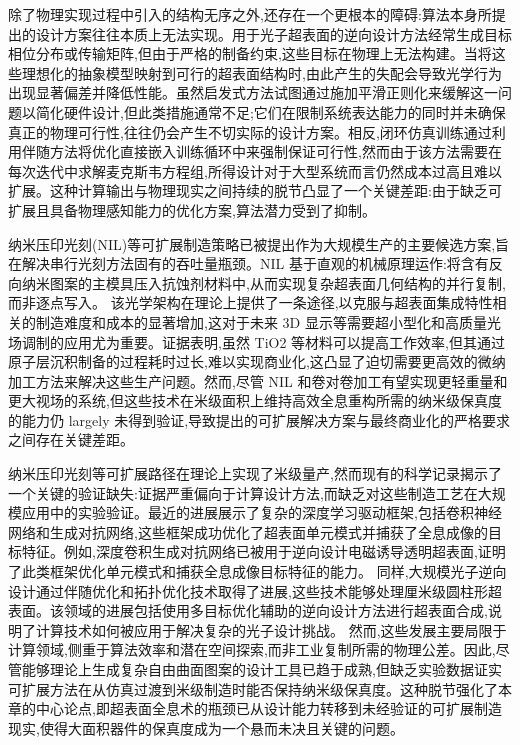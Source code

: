\documentclass[11pt]{article}
\begin{document}
除了物理实现过程中引入的结构无序之外,还存在一个更根本的障碍:算法本身所提出的设计方案往往本质上无法实现。用于光子超表面的逆向设计方法经常生成目标相位分布或传输矩阵,但由于严格的制备约束,这些目标在物理上无法构建。当将这些理想化的抽象模型映射到可行的超表面结构时,由此产生的失配会导致光学行为出现显著偏差并降低性能。虽然启发式方法试图通过施加平滑正则化来缓解这一问题以简化硬件设计,但此类措施通常不足;它们在限制系统表达能力的同时并未确保真正的物理可行性,往往仍会产生不切实际的设计方案。相反,闭环仿真训练通过利用伴随方法将优化直接嵌入训练循环中来强制保证可行性,然而由于该方法需要在每次迭代中求解麦克斯韦方程组,所得设计对于大型系统而言仍然成本过高且难以扩展。这种计算输出与物理现实之间持续的脱节凸显了一个关键差距:由于缺乏可扩展且具备物理感知能力的优化方案,算法潜力受到了抑制。\citep{doi_10_48550_arxiv_2505_18377_a6fc9ec3}

纳米压印光刻(NIL)等可扩展制造策略已被提出作为大规模生产的主要候选方案,旨在解决串行光刻方法固有的吞吐量瓶颈。NIL 基于直观的机械原理运作:将含有反向纳米图案的主模具压入抗蚀剂材料中,从而实现复杂超表面几何结构的并行复制,而非逐点写入。\citep{doi_10_3390_encyclopedia5040197_fe6bfdc9} \citep{doi_10_5772_intechopen_72534_9965e900} 该光学架构在理论上提供了一条途径,以克服与超表面集成特性相关的制造难度和成本的显著增加,这对于未来 3D 显示等需要超小型化和高质量光场调制的应用尤为重要。证据表明,虽然 TiO2 等材料可以提高工作效率,但其通过原子层沉积制备的过程耗时过长,难以实现商业化,这凸显了迫切需要更高效的微纳加工方法来解决这些生产问题。然而,尽管 NIL 和卷对卷加工有望实现更轻重量和更大视场的系统,但这些技术在米级面积上维持高效全息重构所需的纳米级保真度的能力仍 largely 未得到验证,导致提出的可扩展解决方案与最终商业化的严格要求之间存在关键差距。\citep{doi_10_1515_nanoph_2025_0269_b999ce93}

纳米压印光刻等可扩展路径在理论上实现了米级量产,然而现有的科学记录揭示了一个关键的验证缺失:证据严重偏向于计算设计方法,而缺乏对这些制造工艺在大规模应用中的实验验证。最近的进展展示了复杂的深度学习驱动框架,包括卷积神经网络和生成对抗网络,这些框架成功优化了超表面单元模式并捕获了全息成像的目标特征。例如,深度卷积生成对抗网络已被用于逆向设计电磁诱导透明超表面,证明了此类框架优化单元模式和捕获全息成像目标特征的能力。\citep{doi_10_1088_1402_4896_acf007_ad71688e} 同样,大规模光子逆向设计通过伴随优化和拓扑优化技术取得了进展,这些技术能够处理厘米级圆柱形超表面。该领域的进展包括使用多目标优化辅助的逆向设计方法进行超表面合成,说明了计算技术如何被应用于解决复杂的光子设计挑战。\citep{doi_10_1117_12_2529823_81c5e659} 然而,这些发展主要局限于计算领域,侧重于算法效率和潜在空间探索,而非工业复制所需的物理公差。因此,尽管能够理论上生成复杂自由曲面图案的设计工具已趋于成熟,但缺乏实验数据证实可扩展方法在从仿真过渡到米级制造时能否保持纳米级保真度。这种脱节强化了本章的中心论点,即超表面全息术的瓶颈已从设计能力转移到未经验证的可扩展制造现实,使得大面积器件的保真度成为一个悬而未决且关键的问题。\citep{doi_10_3390_photonics12100947_b44bdefd} \citep{doi_10_1515_nanoph_2024_0127_c4fd5a12}
\end{document}
